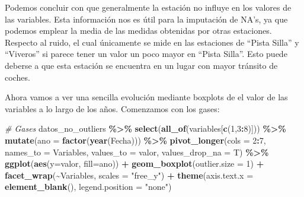 \documentclass[notspecified,article,submit,moreauthors,pdftex]{Definitions/mdpi}
\newenvironment{Shaded}{\begin{snugshade}}{\end{snugshade}}
\newcommand{\AttributeTok}[1]{\textcolor[rgb]{0.13,0.29,0.53}{#1}}
\newcommand{\CommentTok}[1]{\textcolor[rgb]{0.56,0.35,0.01}{\textit{#1}}}
\newcommand{\DecValTok}[1]{\textcolor[rgb]{0.00,0.00,0.81}{#1}}
\newcommand{\FunctionTok}[1]{\textcolor[rgb]{0.13,0.29,0.53}{\textbf{#1}}}
\newcommand{\NormalTok}[1]{#1}
\newcommand{\SpecialCharTok}[1]{\textcolor[rgb]{0.81,0.36,0.00}{\textbf{#1}}}
\newcommand{\StringTok}[1]{\textcolor[rgb]{0.31,0.60,0.02}{#1}}
\begin{document}
Podemos concluir con que generalmente la estación no influye en los
valores de las variables. Esta información nos es útil para la
imputación de NA's, ya que podemos emplear la media de las medidas
obtenidas por otras estaciones. Respecto al ruido, el cual únicamente se
mide en las estaciones de ``Pista Silla'' y ``Viveros'' si parece tener
un valor un poco mayor en ``Pista Silla''. Esto puede deberse a que esta
estación se encuentra en un lugar con mayor tránsito de coches.

Ahora vamos a ver una sencilla evolución mediante boxplots de el valor
de las variables a lo largo de los años. Comenzamos con los gases:

\begin{Shaded}
\begin{Highlighting}[]
\CommentTok{\# Gases}
\NormalTok{datos\_no\_outliers }\SpecialCharTok{\%\textgreater{}\%}
  \FunctionTok{select}\NormalTok{(}\FunctionTok{all\_of}\NormalTok{(variables[}\FunctionTok{c}\NormalTok{(}\DecValTok{1}\NormalTok{,}\DecValTok{3}\SpecialCharTok{:}\DecValTok{8}\NormalTok{)])) }\SpecialCharTok{\%\textgreater{}\%}
  \FunctionTok{mutate}\NormalTok{(}\AttributeTok{ano =} \FunctionTok{factor}\NormalTok{(}\FunctionTok{year}\NormalTok{(Fecha))) }\SpecialCharTok{\%\textgreater{}\%}
  \FunctionTok{pivot\_longer}\NormalTok{(}\AttributeTok{cols =} \DecValTok{2}\SpecialCharTok{:}\DecValTok{7}\NormalTok{, }\AttributeTok{names\_to =} \StringTok{\textquotesingle{}Variables\textquotesingle{}}\NormalTok{, }\AttributeTok{values\_to =} \StringTok{\textquotesingle{}valor\textquotesingle{}}\NormalTok{, }\AttributeTok{values\_drop\_na =}\NormalTok{ T) }\SpecialCharTok{\%\textgreater{}\%}
  \FunctionTok{ggplot}\NormalTok{(}\FunctionTok{aes}\NormalTok{(}\AttributeTok{y=}\NormalTok{valor, }\AttributeTok{fill=}\NormalTok{ano)) }\SpecialCharTok{+} 
  \FunctionTok{geom\_boxplot}\NormalTok{(}\AttributeTok{outlier.size =} \DecValTok{1}\NormalTok{) }\SpecialCharTok{+}
  \FunctionTok{facet\_wrap}\NormalTok{(}\SpecialCharTok{\textasciitilde{}}\NormalTok{Variables, }\AttributeTok{scales =} \StringTok{"free\_y"}\NormalTok{) }\SpecialCharTok{+} 
  \FunctionTok{theme}\NormalTok{(}\AttributeTok{axis.text.x =} \FunctionTok{element\_blank}\NormalTok{(), }\AttributeTok{legend.position =} \StringTok{"none"}\NormalTok{)}
\end{Highlighting}
\end{Shaded}
\end{document}
